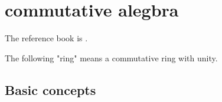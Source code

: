 \setchapterpreamble[u]{\margintoc}
\chapter{commutative alegbra}

The reference book is \cite{Atiyah}.

The following "ring" means a commutative ring with unity.

\section{Basic concepts}








